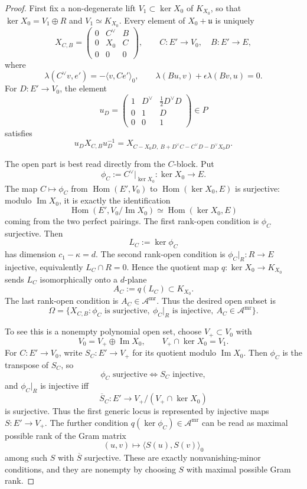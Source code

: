 \documentclass[10pt]{article}
\newcommand{\uP}{\mathfrak u}
\newcommand{\K}{K_{X_0}}
\newcommand{\Amr}{\mathscr A^{\mathrm{mr}}}
\newcommand{\im}{\operatorname{Im}}
\newcommand{\Hom}{\operatorname{Hom}}
\begin{document}
\begin{proof}
First fix a non-degenerate lift \(V_1\subset\ker X_0\) of \(\K\), so that
\(\ker X_0=V_1\oplus R\) and \(V_1\simeq\K\).  Every element of
\(X_0+\uP\) is uniquely
\[
X_{C,B}=
\begin{pmatrix}
0&C^\vee&B\\
0&X_0&C\\
0&0&0
\end{pmatrix},
\qquad C:E'\to V_0,\quad B:E'\to E,
\]
where
\[
\lambda(C^\vee v,e')=-\langle v,Ce'\rangle_0,\qquad
\lambda(Bu,v)+\epsilon\lambda(Bv,u)=0.
\]
For \(D:E'\to V_0\), the element
\[
u_D=
\begin{pmatrix}
1&D^\vee&\frac12D^\vee D\\
0&1&D\\
0&0&1
\end{pmatrix}\in P
\]
satisfies
\[
u_DX_{C,B}u_D^{-1}
=X_{C-X_0D,\ B+D^\vee C-C^\vee D-D^\vee X_0D}.
\tag{1}
\]

The open part is best read directly from the \(C\)-block.  Put
\[
\phi_C:=C^\vee|_{\ker X_0}:\ker X_0\to E .
\]
The map \(C\mapsto \phi_C\) from \(\Hom(E',V_0)\) to
\(\Hom(\ker X_0,E)\) is surjective: modulo \(\im X_0\), it is exactly the
identification
\[
\Hom(E',V_0/\im X_0)\simeq \Hom(\ker X_0,E)
\]
coming from the two perfect pairings.  The first rank-open condition is
\(\phi_C\) surjective.  Then
\[
L_C:=\ker\phi_C
\]
has dimension \(c_1-\kappa=d\).  The second rank-open condition is
\(\phi_C|_R:R\to E\) injective, equivalently \(L_C\cap R=0\).  Hence the
quotient map \(q:\ker X_0\to\K\) sends \(L_C\) isomorphically onto a
\(d\)-plane
\[
A_C:=q(L_C)\subset\K .
\]
The last rank-open condition is \(A_C\in\Amr\).  Thus the desired open subset
is
\[
\Omega=\{X_{C,B}:\phi_C\text{ is surjective},\
\phi_C|_R\text{ is injective},\ A_C\in\Amr\}.
\tag{2}
\]

To see this is a nonempty polynomial open set, choose \(V_+\subset V_0\) with
\[
V_0=V_+\oplus\im X_0,\qquad V_+\cap\ker X_0=V_1.
\]
For \(C:E'\to V_0\), write \(S_C:E'\to V_+\) for its quotient modulo
\(\im X_0\).  Then \(\phi_C\) is the transpose of \(S_C\), so
\[
\phi_C\text{ surjective}\iff S_C\text{ injective},
\]
and \(\phi_C|_R\) is injective iff
\[
\overline S_C:E'\to V_+/(V_+\cap\ker X_0)
\]
is surjective.  Thus the first generic locus is represented by injective maps
\(S:E'\to V_+\).  The further condition \(q(\ker\phi_C)\in\Amr\) can be read as
maximal possible rank of the Gram matrix
\[
(u,v)\mapsto \langle S(u),S(v)\rangle_0
\]
among such \(S\) with \(\overline S\) surjective.  These are exactly
nonvanishing-minor conditions, and they are nonempty by choosing \(S\) with
maximal possible Gram rank.


\end{proof}
\end{document}
